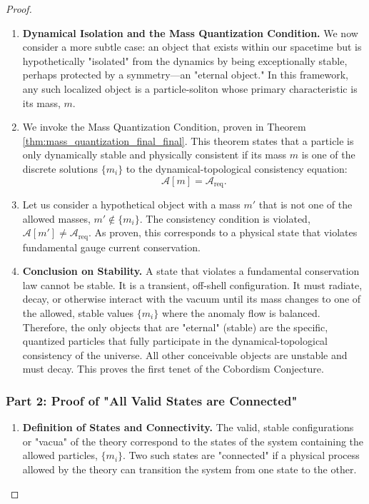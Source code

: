 \documentclass[11pt, letterpaper]{report}
\theoremstyle{plain} %
\theoremstyle{definition} %
\theoremstyle{remark} %
\begin{document}
\begin{proof}
\begin{enumerate}
    \item \textbf{Dynamical Isolation and the Mass Quantization Condition.} We now consider a more subtle case: an object that exists within our spacetime but is hypothetically "isolated" from the dynamics by being exceptionally stable, perhaps protected by a symmetry—an "eternal object." In this framework, any such localized object is a particle-soliton whose primary characteristic is its mass, $m$.

    \item We invoke the Mass Quantization Condition, proven in Theorem \ref{thm:mass_quantization_final_final}. This theorem states that a particle is only dynamically stable and physically consistent if its mass $m$ is one of the discrete solutions $\{m_i\}$ to the dynamical-topological consistency equation:
    \begin{equation}
        \mathcal{A}[m] = \mathcal{A}_{\text{req}}.
    \end{equation}

    \item Let us consider a hypothetical object with a mass $m'$ that is not one of the allowed masses, $m' \notin \{m_i\}$. The consistency condition is violated, $\mathcal{A}[m'] \neq \mathcal{A}_{\text{req}}$. As proven, this corresponds to a physical state that violates fundamental gauge current conservation.

    \item \textbf{Conclusion on Stability.} A state that violates a fundamental conservation law cannot be stable. It is a transient, off-shell configuration. It must radiate, decay, or otherwise interact with the vacuum until its mass changes to one of the allowed, stable values $\{m_i\}$ where the anomaly flow is balanced. Therefore, the only objects that are "eternal" (stable) are the specific, quantized particles that fully participate in the dynamical-topological consistency of the universe. All other conceivable objects are unstable and must decay. This proves the first tenet of the Cobordism Conjecture.
\end{enumerate}

\subsubsection*{Part 2: Proof of "All Valid States are Connected"}

\begin{enumerate}
    \item \textbf{Definition of States and Connectivity.} The valid, stable configurations or "vacua" of the theory correspond to the states of the system containing the allowed particles, $\{m_i\}$. Two such states are "connected" if a physical process allowed by the theory can transition the system from one state to the other.


\end{enumerate}
\end{proof}
\end{document}

